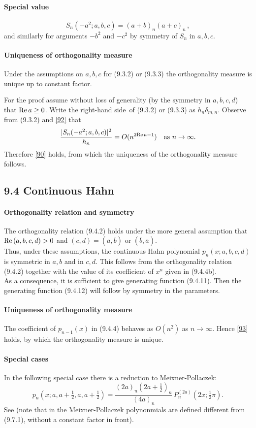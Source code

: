 \documentclass[twoside,11pt]{article}
\newcommand\de\delta
\newcommand\thalf{\tfrac12}
\newcommand\iy\infty
\newcommand\RHS{right-hand side}
\renewcommand\Re{{\rm Re}\,}
\begin{document}
\paragraph{Special value}
\begin{equation}
S_n(-a^2;a,b,c)=(a+b)_n(a+c)_n\,,
\label{92}
\end{equation}
and similarly for arguments $-b^2$ and $-c^2$ by symmetry of $S_n$ in $a,b,c$.
%
\paragraph{Uniqueness of orthogonality measure}
Under the assumptions on $a,b,c$ for (9.3.2) or (9.3.3) the orthogonality
measure is unique up to constant factor.

For the proof assume without
loss of generality (by the symmetry in $a,b,c,d$) that $\Re a\geq0$.
Write the \RHS\ of (9.3.2) or (9.3.3) as $h_n\de_{m,n}$.
Observe from (9.3.2) and \eqref{92} that
\[
\frac{|S_n(-a^2;a,b,c)|^2}{h_n} = O(n^{2\Re a-1})\quad
\hbox{as $n\to\iy$.}
\]
Therefore \eqref{90} holds, from which the uniqueness of the orthogonality
measure follows.
%
\subsection*{9.4 Continuous Hahn}
\label{sec9.4}
%
\paragraph{Orthogonality relation and symmetry}
The orthogonality relation (9.4.2) holds under the more general assumption that
$\Re(a,b,c,d)>0$ and $(c,d)=(\overline a,\overline b)$ or $(\overline b,\overline a)$.\\
Thus, under these assumptions, the continuous Hahn polynomial
$p_n(x;a,b,c,d)$
is symmetric in $a,b$ and in $c,d$.
This follows from the orthogonality relation (9.4.2)
together with the value of its coefficient of $x^n$ given in (9.4.4b).\\
As a consequence, it is sufficient to give generating function (9.4.11). Then the generating
function (9.4.12) will follow by symmetry in the parameters.
%
\paragraph{Uniqueness of orthogonality measure}
The coefficient of $p_{n-1}(x)$ in (9.4.4) behaves as $O(n^2)$ as $n\to\iy$.
Hence \eqref{93} holds, by which the orthogonality measure is unique.
%
\paragraph{Special cases}
In the following special case there is a reduction to
Meixner-Pollaczek:
\begin{equation}
p_n(x;a,a+\thalf,a,a+\thalf)=
\frac{(2a)_n (2a+\thalf)_n}{(4a)_n}\,P_n^{(2a)}(2x;\thalf\pi).
\end{equation}
See  (note that in  the
Meixner-Pollaczek polynonmials are defined different from (9.7.1),
without a constant factor in front).
\end{document}
